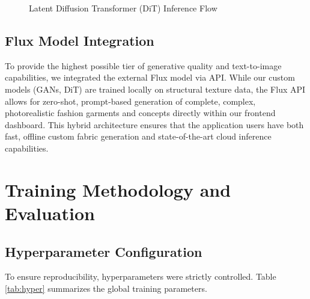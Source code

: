 \documentclass[12pt,a4paper]{article}
\begin{document}
\begin{figure}[H]
\centering
{}
\caption{Latent Diffusion Transformer (DiT) Inference Flow}
\end{figure}

\subsection{Flux Model Integration}
To provide the highest possible tier of generative quality and text-to-image capabilities, we integrated the external Flux model via API. While our custom models (GANs, DiT) are trained locally on structural texture data, the Flux API allows for zero-shot, prompt-based generation of complete, complex, photorealistic fashion garments and concepts directly within our frontend dashboard. This hybrid architecture ensures that the application users have both fast, offline custom fabric generation and state-of-the-art cloud inference capabilities.

\section{Training Methodology and Evaluation}

\subsection{Hyperparameter Configuration}
To ensure reproducibility, hyperparameters were strictly controlled. Table \ref{tab:hyper} summarizes the global training parameters.
\end{document}
